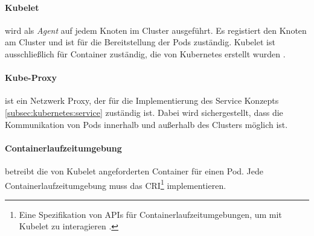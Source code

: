 \paragraph{Kubelet} wird als \emph{Agent} auf jedem Knoten im Cluster ausgeführt. 
Es registiert den Knoten am Cluster und ist für die Bereitstellung der Pods zuständig.
Kubelet ist ausschließlich für Container zuständig, die von Kubernetes erstellt wurden \cite{kubernetesComponents}.

\paragraph{Kube-Proxy} ist ein Netzwerk Proxy, der für die Implementierung des Service Konzepts \ref{subsec:kubernetes:service}
zuständig ist. 
Dabei wird sichergestellt, dass die Kommunikation von Pods innerhalb und außerhalb des Clusters möglich ist.

\paragraph{Containerlaufzeitumgebung} betreibt die von Kubelet angeforderten Container für einen Pod. 
Jede Containerlaufzeitumgebung muss das 
\ac{CRI}\footnote{Eine Spezifikation von APIs für Containerlaufzeitumgebungen, um mit Kubelet zu interagieren \cite{cri}.} implementieren.
